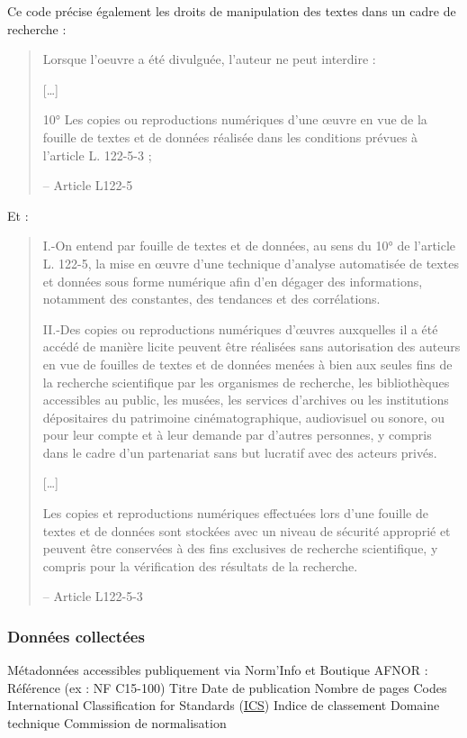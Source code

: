 \documentclass[a4paper,12pt]{article}
\begin{document}
Ce code précise également les droits de manipulation des textes dans un cadre de recherche :
\begin{quote}
Lorsque l'oeuvre a été divulguée, l'auteur ne peut interdire :

{[}\ldots{}]

10° Les copies ou reproductions numériques d'une œuvre en vue de la fouille de textes et de données réalisée dans les conditions prévues à l'article L. 122-5-3 ;

-- Article L122-5\autocite{CodeProprieteIntellectuelle}
\end{quote}

Et :
\begin{quote}
I.-On entend par fouille de textes et de données, au sens du 10° de l'article L. 122-5, la mise en œuvre d'une technique d'analyse automatisée de textes et données sous forme numérique afin d'en dégager des informations, notamment des constantes, des tendances et des corrélations.

II.-Des copies ou reproductions numériques d'œuvres auxquelles il a été accédé de manière licite peuvent être réalisées sans autorisation des auteurs en vue de fouilles de textes et de données menées à bien aux seules fins de la recherche scientifique par les organismes de recherche, les bibliothèques accessibles au public, les musées, les services d'archives ou les institutions dépositaires du patrimoine cinématographique, audiovisuel ou sonore, ou pour leur compte et à leur demande par d'autres personnes, y compris dans le cadre d'un partenariat sans but lucratif avec des acteurs privés.

{[}\ldots{}]

Les copies et reproductions numériques effectuées lors d'une fouille de textes et de données sont stockées avec un niveau de sécurité approprié et peuvent être conservées à des fins exclusives de recherche scientifique, y compris pour la vérification des résultats de la recherche.

-- Article L122-5-3\autocite{CodeProprieteIntellectuelle}
\end{quote}
\subsubsection{Données collectées}
\label{sec:orgf31c719}
Métadonnées accessibles publiquement via Norm’Info et Boutique AFNOR :
    Référence (ex : NF C15-100)
    Titre
    Date de publication
    Nombre de pages
    Codes International Classification for Standards
 (\protect\hyperlink{gls-10}{\label{gls-10-use-1}ICS})
    Indice de classement
    Domaine technique
    Commission de normalisation
\end{document}
